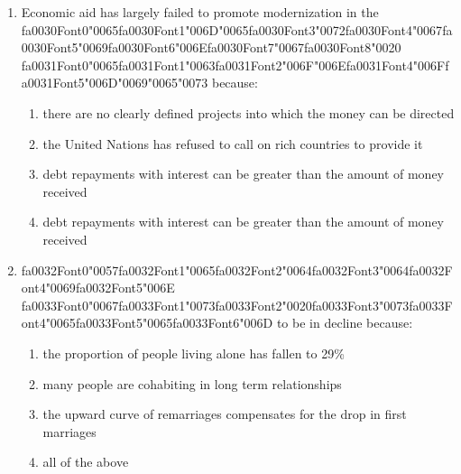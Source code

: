 \documentclass[12pt]{article}
\begin{document}
\begin{enumerate}[label=\arabic*.]
\begin{enumerate}[label=(\alph*)]
    \item Salaries
\end{enumerate}
\item Economic aid has largely failed to promote modernization in the {\csname fa0030Font0\endcsname\char"0065}{\csname fa0030Font1\endcsname\char"006D}{\char"0065}{\csname fa0030Font3\endcsname\char"0072}{\csname fa0030Font4\endcsname\char"0067}{\csname fa0030Font5\endcsname\char"0069}{\csname fa0030Font6\endcsname\char"006E}{\csname fa0030Font7\endcsname\char"0067}{\csname fa0030Font8\endcsname\char"0020} {\csname fa0031Font0\endcsname\char"0065}{\csname fa0031Font1\endcsname\char"0063}{\csname fa0031Font2\endcsname\char"006F}{\char"006E}{\csname fa0031Font4\endcsname\char"006F}{\csname fa0031Font5\endcsname\char"006D}{\char"0069}{\char"0065}{\char"0073} because:
\begin{enumerate}[label=(\alph*)]
    \item there are no clearly defined projects into which the money can be directed
    \item the United Nations has refused to call on rich countries to provide it
    \item debt repayments with interest can be greater than the amount of money received
    \item debt repayments with interest can be greater than the amount of money received
\end{enumerate}
\item {\csname fa0032Font0\endcsname\char"0057}{\csname fa0032Font1\endcsname\char"0065}{\csname fa0032Font2\endcsname\char"0064}{\csname fa0032Font3\endcsname\char"0064}{\csname fa0032Font4\endcsname\char"0069}{\csname fa0032Font5\endcsname\char"006E} {\csname fa0033Font0\endcsname\char"0067}{\csname fa0033Font1\endcsname\char"0073}{\csname fa0033Font2\endcsname\char"0020}{\csname fa0033Font3\endcsname\char"0073}{\csname fa0033Font4\endcsname\char"0065}{\csname fa0033Font5\endcsname\char"0065}{\csname fa0033Font6\endcsname\char"006D} to be in decline because:
\begin{enumerate}[label=(\alph*)]
    \item the proportion of people living alone has fallen to 29\%
    \item many people are cohabiting in long term relationships
    \item the upward curve of remarriages compensates for the drop in first marriages
    \item all of the above
\end{enumerate}

\end{enumerate}
\end{document}
